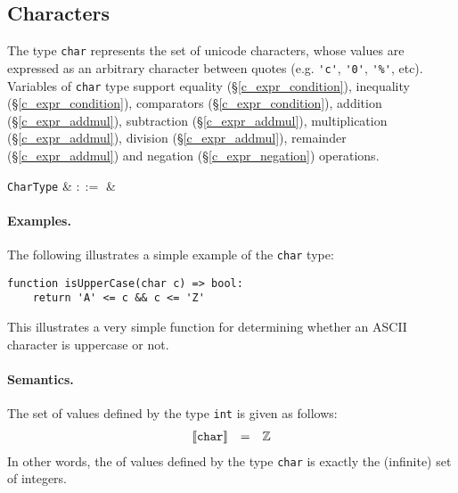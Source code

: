 
\subsection{Characters}
\label{c_types_char}

The type \lstinline{char} represents the set of unicode characters, whose values are expressed as an arbitrary character between quotes (e.g. \lstinline{'c'}, \lstinline{'0'}, \lstinline{'%'}, etc).  Variables of \lstinline{char} type support equality (\S\ref{c_expr_condition}), inequality (\S\ref{c_expr_condition}), comparators (\S\ref{c_expr_condition}), addition (\S\ref{c_expr_addmul}), subtraction (\S\ref{c_expr_addmul}), multiplication (\S\ref{c_expr_addmul}), division (\S\ref{c_expr_addmul}), remainder (\S\ref{c_expr_addmul}) and negation (\S\ref{c_expr_negation}) operations. 

\begin{syntax}
  \verb+CharType+ & $::=$ &  \\
\end{syntax}

\paragraph{Examples.}  The following illustrates a simple example of the \lstinline{char} type:

\begin{lstlisting}
function isUpperCase(char c) => bool:
    return 'A' <= c && c <= 'Z'
\end{lstlisting}
This illustrates a very simple function for determining whether an ASCII character is uppercase or not.

\paragraph{Semantics.}  The set of values defined by the type \lstinline{int} is given as follows:
\begin{displaymath}
\begin{array}{rcl}
{\tt\llbracket char\rrbracket} & = & {\tt\mathbb{Z}}\\
\end{array}
\end{displaymath}
In other words, the of values defined by the type \lstinline{char} is exactly the (infinite) set of integers.

